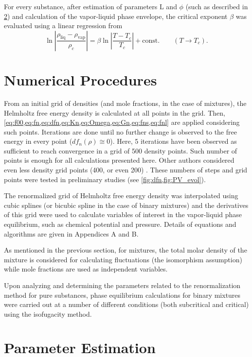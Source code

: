 \documentclass[preprint,12pt,3p]{elsarticle}
\begin{document}
For every substance, after estimation of parameters L and $\phi$ (such as described in \cref{sec:Parameter Estimation}) and calculation of the vapor-liquid phase envelope, the critical exponent $\beta$ was evaluated using a linear regression from
\begin{equation} \label{eq:beta_law}
\ln\left|\frac{\rho_\text{liq}-\rho_\text{vap}}{\rho_{c}}\right| = \beta \ln\left|\frac{T-T_{c}}{T_{c}}\right|+\text{const.} \qquad (T \rightarrow T_{c}).
\end{equation}

\section{Numerical Procedures}
From an initial grid of densities (and mole fractions, in the case of mixtures), the Helmholtz free energy density is calculated at all points in the grid.
Then, \cref{eq:f00,eq:fn,eq:dfn,eq:Kn,eq:Omega,eq:Gn,eq:fns,eq:fnl} are applied considering such points.
Iterations are done until no further change is observed to the free energy in every point ($df_{n}(\rho) \cong 0$).
Here, 5 iterations have been observed as sufficient to reach convergence in a grid of 500 density points.
Such number of points is enough for all calculations presented here.
Other authors considered even less density grid points (400, or even 200) \cite{cai2004thermodynamics}.
These numbers of steps and grid points were tested in preliminary studies (see \cref{fig:dfn,fig:PV_evol}).

The renormalized grid of Helmholtz free energy density was interpolated using cubic splines (or bicubic spline in the case of binary mixtures) and the derivatives of this grid were used to calculate variables of interest in the vapor-liquid phase equilibrium, such as chemical potential and pressure.
Details of equations and algorithms are given in Appendices A and B.

As mentioned in the previous section, for mixtures, the total molar density of the mixture is considered for calculating fluctuations (the isomorphism assumption) while mole fractions are used as independent variables.

Upon analyzing and determining the parameters related to the renormalization method for pure substances, phase equilibrium calculations for binary mixtures were carried out at a number of different conditions (both subcritical and critical) using the isofugacity method.

\section{Parameter Estimation}
\label{sec:Parameter Estimation}
\end{document}
